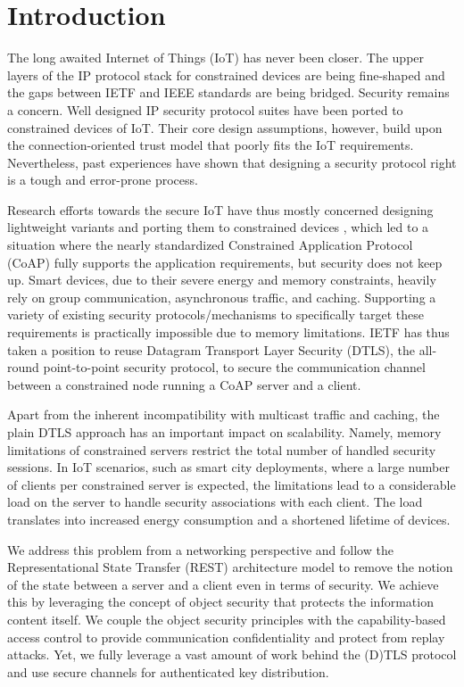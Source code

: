 \documentclass[conference]{IEEEtran}
\begin{document}
\section{Introduction}
\label{introduction}
The long awaited Internet of Things (IoT) has never been closer. The upper layers of the IP protocol stack for constrained devices are being fine-shaped and the gaps between IETF and IEEE standards are being bridged. Security remains a concern. Well designed IP security protocol suites have been ported to constrained devices of IoT. Their core design assumptions, however, build upon the connection-oriented trust model that poorly fits the IoT requirements. Nevertheless, past experiences have shown that designing a security protocol right is a tough and error-prone process. 

Research efforts towards the secure IoT have thus mostly concerned designing
lightweight variants and porting them to constrained devices \cite{sizzle,
  lithe, raza2011securing, raza20126lowpan}, which led to a situation where the
nearly standardized Constrained Application Protocol (CoAP) \cite{coap-draft}
fully supports the application requirements, but security does not keep
up. Smart devices, due to their severe energy and memory constraints, heavily
rely on group communication, asynchronous traffic, and caching. Supporting a
variety of existing security protocols/mechanisms to specifically target these
requirements is practically impossible due to memory limitations. IETF has thus
taken a position \cite{coap-draft} to reuse Datagram Transport Layer Security (DTLS),
 the all-round point-to-point security protocol, to secure the communication
 channel between a constrained node running a CoAP server and a client.

Apart from the inherent incompatibility with multicast traffic and caching, the
plain DTLS approach has an important impact on scalability. Namely, memory
limitations of constrained servers restrict the total number of handled security
sessions. In IoT scenarios, such as smart city deployments, where a large number
of clients per constrained server is expected, the limitations lead to a
considerable load on the server to handle security associations with each
client. The load translates into increased energy consumption and a shortened lifetime of devices. 

We address this problem from a networking perspective and follow the Representational
State Transfer (REST)
architecture model \cite{rest} to remove the notion of the state between a
server and a client even in terms of security. We achieve this by leveraging the
concept of object security that protects the information content itself. We
couple the object security principles with the capability-based access control
to provide communication confidentiality and protect from replay attacks. Yet,
we fully leverage a vast amount of work behind the (D)TLS protocol and use
secure channels for authenticated key distribution.
\end{document}

